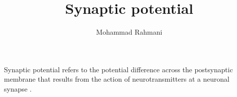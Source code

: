 \documentclass[a4paper]{article}
\title{Synaptic potential}
\date{}
\author{Mohammad Rahmani}
\begin{document}
\maketitle
    Synaptic potential refers to the potential difference across the postsynaptic membrane that results from the action of neurotransmitters at a neuronal synapse .
    
    
\end{document}
